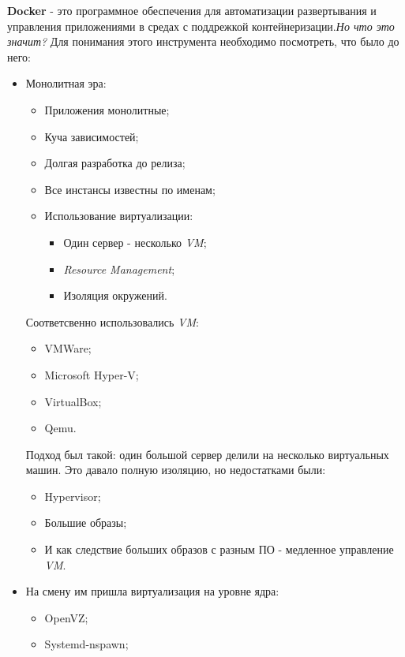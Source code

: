 \textbf{Docker} - это программное обеспечения для автоматизации развертывания и управления приложениями в средах с поддрежкой контейнеризации.\textit{Но что это значит?} Для понимания этого инструмента необходимо посмотреть, что было до него:
\begin{itemize}
    \item Монолитная эра:
        \begin{itemize}
            \item Приложения монолитные;
            \item Куча зависимостей;
            \item Долгая разработка до релиза;
            \item Все инстансы известны по именам;
            \item Использование виртуализации:
                \begin{itemize}
                    \item Один сервер - несколько \textit{VM};
                    \item \textit{Resource Management};
                    \item Изоляция окружений.
                \end{itemize}
        \end{itemize}
        Соответсвенно использовались \textit{VM}:
        \begin{itemize}
            \item VMWare;
            \item Microsoft Hyper-V;
            \item VirtualBox;
            \item Qemu.
        \end{itemize}
        Подход был такой: один большой сервер делили на несколько виртуальных машин. Это давало полную изоляцию, но недостатками были:
        \begin{itemize}
            \item Hypervisor;
            \item Большие образы;
            \item И как следствие больших образов с разным ПО - медленное управление \textit{VM}.
        \end{itemize}
    \item На смену им пришла виртуализация на уровне ядра:
        \begin{itemize}
            \item OpenVZ;
            \item Systemd-nspawn;

\end{itemize}
\end{itemize}
